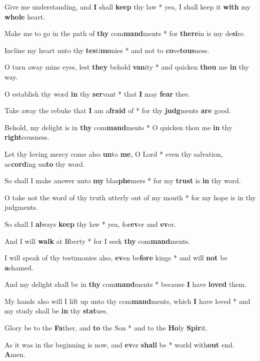 \begin{multicols}{2}
	Give me understanding, and \textbf{I} shall \textbf{keep} thy law * yea, I shall keep it \textbf{with} my \textbf{whole} heart.
	
	Make me to go in the path of \textbf{thy} com\textbf{mand}ments * for \textbf{there}in is my de\textbf{si}re.
	
	Incline my heart unto thy \textbf{tes}ti\textbf{mo}nies * and not to \textbf{co}ve\textbf{tous}ness.
	
	O turn away mine eyes, lest \textbf{they} behold \textbf{van}ity * and quicken \textbf{thou} me \textbf{in} thy way.
	
	O establish thy word \textbf{in} thy \textbf{ser}vant * that \textbf{I} may \textbf{fear} thee.
	
	Take away the rebuke that \textbf{I} am a\textbf{fraid} of * for thy \textbf{judg}ments \textbf{are} good.
	
	Behold, my delight is in \textbf{thy} com\textbf{mand}ments * O quicken thou me \textbf{in} thy \textbf{right}eousness.
	
	Let thy loving mercy come also \textbf{un}to \textbf{me}, O Lord * even thy salvation, ac\textbf{cord}ing un\textbf{to} thy word.
	
	So shall I make answer unto \textbf{my} blas\textbf{phe}mers * for my \textbf{trust} is \textbf{in} thy word.
	
	O take not the word of thy truth utterly out of my mouth * for my hope is in thy judgments.
	
	So shall I \textbf{al}ways \textbf{keep} thy law * yea, for\textbf{ev}er and \textbf{ev}er.
	
	And I will \textbf{walk} at \textbf{li}berty * for I seek \textbf{thy} com\textbf{mand}ments.
	
	I will speak of thy testimonies also, \textbf{ev}en be\textbf{fore} kings * and will \textbf{not} be \textbf{a}shamed.
	
	And my delight shall be in \textbf{thy} com\textbf{mand}ments * because \textbf{I} have \textbf{loved} them.
	
	My hands also will I lift up unto thy com\textbf{mand}ments, which \textbf{I} have loved * and my study shall be \textbf{in} thy \textbf{stat}ues.
	
	Glory be to the \textbf{Fa}ther, and \textbf{to} the Son * and to the \textbf{Ho}ly \textbf{Spir}it.
	
	As it was in the beginning is now, and \textbf{ev}er \textbf{shall} be * world with\textbf{out} end. \textbf{A}men.
\end{multicols}